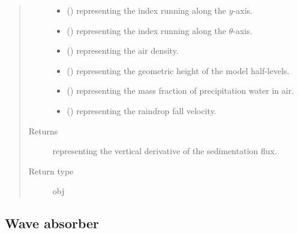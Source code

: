 \documentclass[letterpaper,10pt,english]{sphinxmanual}
\begin{document}
\begin{fulllineitems}
\begin{fulllineitems}
\begin{quote}
\begin{description}
\begin{itemize}
\item {} 
 () \textendash{}  representing the index running along the \(y\)-axis.

\item {} 
 () \textendash{}  representing the index running along the \(\theta\)-axis.

\item {} 
 () \textendash{}  representing the air density.

\item {} 
 () \textendash{}  representing the geometric height of the model half-levels.

\item {} 
 () \textendash{}  representing the mass fraction of precipitation water in air.

\item {} 
 () \textendash{}  representing the raindrop fall velocity.

\end{itemize}

\item[{Returns}] \leavevmode
{} representing the vertical derivative of the sedimentation flux.

\item[{Return type}] \leavevmode
obj

\end{description}\end{quote}

\end{fulllineitems}


\end{fulllineitems}



\subsection{Wave absorber}
\label{\detokenize{api:wave-absorber}}
\end{document}
